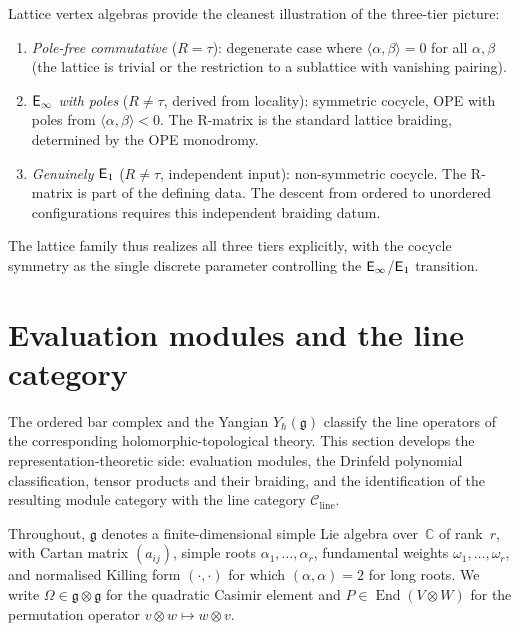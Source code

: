 \begin{remark}
\label{rem:lattice-three-tier}
Lattice vertex algebras provide the cleanest illustration of the
three-tier picture:
\begin{enumerate}[label=(\roman*)]
\item \emph{Pole-free commutative} ($R = \tau$): degenerate case where
 $\langle\alpha,\beta\rangle = 0$ for all $\alpha, \beta$ (the lattice
 is trivial or the restriction to a sublattice with vanishing pairing).
\item \emph{$\mathsf{E}_{\infty}$ with poles} ($R \neq \tau$, derived from locality):
 symmetric cocycle, OPE with poles from
 $\langle\alpha,\beta\rangle < 0$. The R-matrix is the standard lattice
 braiding, determined by the OPE monodromy.
\item \emph{Genuinely $\mathsf{E}_1$} ($R \neq \tau$, independent input):
 non-symmetric cocycle. The R-matrix is part of the defining data.
 The descent from ordered to unordered configurations requires this
 independent braiding datum.
\end{enumerate}
The lattice family thus realizes all three tiers explicitly, with the
cocycle symmetry as the single discrete parameter controlling the
$\mathsf{E}_{\infty}$/$\mathsf{E}_1$ transition.
\end{remark}



\section{Evaluation modules and the line category}
\label{sec:evaluation-modules}

The ordered bar complex and the Yangian $Y_\hbar(\mathfrak{g})$ classify the
line operators of the corresponding holomorphic-topological theory. This
section develops the representation-theoretic side: evaluation modules, the
Drinfeld polynomial classification, tensor products and their braiding, and the
identification of the resulting module category with the line category
$\mathcal{C}_{\mathrm{line}}$.

Throughout, $\mathfrak{g}$ denotes a finite-dimensional simple Lie algebra
over~$\mathbb{C}$ of rank~$r$, with Cartan matrix $(a_{ij})$,
simple roots $\alpha_1,\dots,\alpha_r$, fundamental weights
$\omega_1,\dots,\omega_r$, and normalised Killing form
$(\cdot,\cdot)$ for which $(\alpha,\alpha)=2$ for long roots. We write
$\Omega\in\mathfrak{g}\otimes\mathfrak{g}$ for the quadratic Casimir element
and $P\in\operatorname{End}(V\otimes W)$ for the permutation operator
$v\otimes w\mapsto w\otimes v$.

